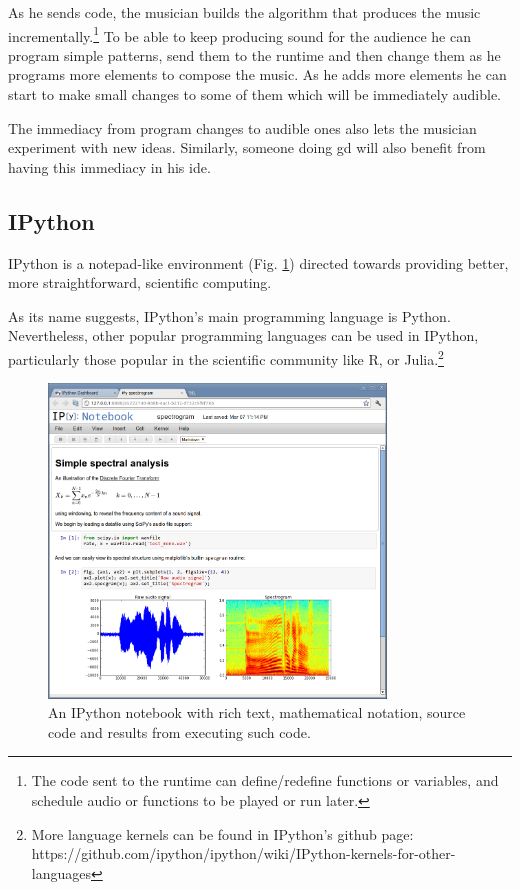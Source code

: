 As he sends code, the musician builds the algorithm that produces the music incrementally.\footnote{The code sent to the runtime can define/redefine functions or variables, and schedule audio or functions to be played or run later.}
To be able to keep producing sound for the audience he can program simple patterns, send them to the runtime and then change them as he programs more elements to compose the music.
As he adds more elements he can start to make small changes to some of them which will be immediately audible.

The immediacy from program changes to audible ones also lets the musician experiment with new ideas.
Similarly, someone doing \gls{gd} will also benefit from having this immediacy in his \gls{ide}.


\subsection{IPython}
\label{section:ipython:related}
IPython\cite{PER-GRA:2007} is a notepad-like environment (Fig. \ref{fig:ipython:notebook}) directed towards providing better, more straightforward, scientific computing.

As its name suggests, IPython's main programming language is Python.
Nevertheless, other popular programming languages can be used in IPython, particularly those popular in the scientific community like R, or Julia.\footnote{More language kernels can be found in IPython's github page: https://github.com/ipython/ipython/wiki/IPython-kernels-for-other-languages}

\begin{figure}
	\centering
	\includegraphics[width=0.8\textwidth]{images/ipython_notebook}
	\caption{An IPython notebook with rich text, mathematical notation, source code and results from executing such code.}
	\label{fig:ipython:notebook}
\end{figure}

